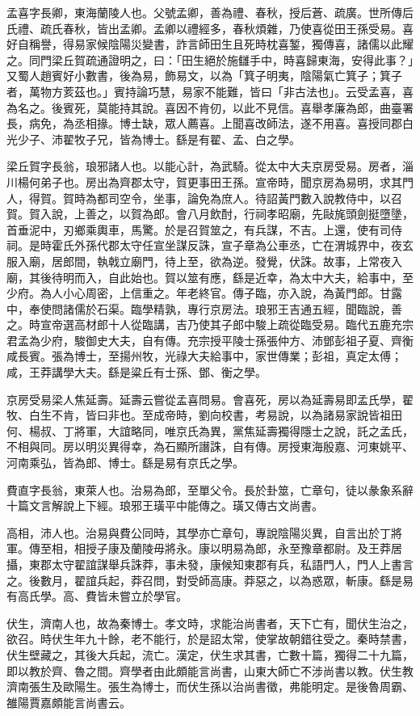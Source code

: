 \begin{pinyinscope}
孟喜字長卿，東海蘭陵人也。父號孟卿，善為禮、春秋，授后蒼、疏廣。世所傳后氏禮、疏氏春秋，皆出孟卿。孟卿以禮經多，春秋煩雜，乃使喜從田王孫受易。喜好自稱譽，得易家候陰陽災變書，詐言師田生且死時枕喜錾，獨傳喜，諸儒以此耀之。同門梁丘賀疏通證明之，曰：「田生絕於施讎手中，時喜歸東海，安得此事？」又蜀人趙賓好小數書，後為易，飾易文，以為「箕子明夷，陰陽氣亡箕子；箕子者，萬物方荄茲也。」賓持論巧慧，易家不能難，皆曰「非古法也」。云受孟喜，喜為名之。後賓死，莫能持其說。喜因不肯仞，以此不見信。喜舉孝廉為郎，曲臺署長，病免，為丞相掾。博士缺，眾人薦喜。上聞喜改師法，遂不用喜。喜授同郡白光少子、沛翟牧子兄，皆為博士。繇是有翟、孟、白之學。

梁丘賀字長翁，琅邪諸人也。以能心計，為武騎。從太中大夫京房受易。房者，淄川楊何弟子也。房出為齊郡太守，賀更事田王孫。宣帝時，聞京房為易明，求其門人，得賀。賀時為都司空令，坐事，論免為庶人。待詔黃門數入說教侍中，以召賀。賀入說，上善之，以賀為郎。會八月飲酎，行祠孝昭廟，先敺旄頭劍挺墮墬，首垂泥中，刃鄉乘輿車，馬驚。於是召賀筮之，有兵謀，不吉。上還，使有司侍祠。是時霍氏外孫代郡太守任宣坐謀反誅，宣子章為公車丞，亡在渭城界中，夜玄服入廟，居郎間，執戟立廟門，待上至，欲為逆。發覺，伏誅。故事，上常夜入廟，其後待明而入，自此始也。賀以筮有應，繇是近幸，為太中大夫，給事中，至少府。為人小心周密，上信重之。年老終官。傳子臨，亦入說，為黃門郎。甘露中，奉使問諸儒於石渠。臨學精孰，專行京房法。琅邪王吉通五經，聞臨說，善之。時宣帝選高材郎十人從臨講，吉乃使其子郎中駿上疏從臨受易。臨代五鹿充宗君孟為少府，駿御史大夫，自有傳。充宗授平陵士孫張仲方、沛鄧彭祖子夏、齊衡咸長賓。張為博士，至揚州牧，光祿大夫給事中，家世傳業；彭祖，真定太傅；咸，王莽講學大夫。繇是粱丘有士孫、鄧、衡之學。

京房受易梁人焦延壽。延壽云嘗從孟喜問易。會喜死，房以為延壽易即孟氏學，翟牧、白生不肯，皆曰非也。至成帝時，劉向校書，考易說，以為諸易家說皆祖田何、楊叔、丁將軍，大誼略同，唯京氏為異，黨焦延壽獨得隱士之說，託之孟氏，不相與同。房以明災異得幸，為石顯所譖誅，自有傳。房授東海殷嘉、河東姚平、河南乘弘，皆為郎、博士。繇是易有京氏之學。

費直字長翁，東萊人也。治易為郎，至單父令。長於卦筮，亡章句，徒以彖象系辭十篇文言解說上下經。琅邪王璜平中能傳之。璜又傳古文尚書。

高相，沛人也。治易與費公同時，其學亦亡章句，專說陰陽災異，自言出於丁將軍。傳至相，相授子康及蘭陵毋將永。康以明易為郎，永至豫章都尉。及王莽居攝，東郡太守翟誼謀舉兵誅莽，事未發，康候知東郡有兵，私語門人，門人上書言之。後數月，翟誼兵起，莽召問，對受師高康。莽惡之，以為惑眾，斬康。繇是易有高氏學。高、費皆未嘗立於學官。

伏生，濟南人也，故為秦博士。孝文時，求能治尚書者，天下亡有，聞伏生治之，欲召。時伏生年九十餘，老不能行，於是詔太常，使掌故朝錯往受之。秦時禁書，伏生壁藏之，其後大兵起，流亡。漢定，伏生求其書，亡數十篇，獨得二十九篇，即以教於齊、魯之間。齊學者由此頗能言尚書，山東大師亡不涉尚書以教。伏生教濟南張生及歐陽生。張生為博士，而伏生孫以治尚書徵，弗能明定。是後魯周霸、雒陽賈嘉頗能言尚書云。


\end{pinyinscope}
